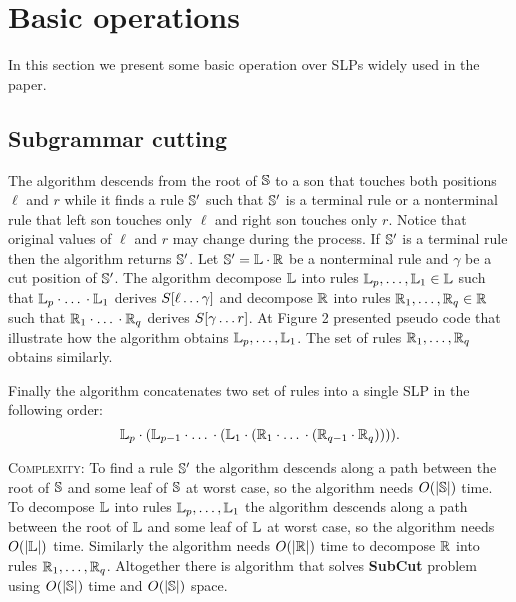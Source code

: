﻿\documentclass[11pt]{article}
\begin{document}
\begin{figure}[t]
	\FibonacciWordSLP
\end{figure}

\section{Basic operations}

In this section we present some basic operation over SLPs widely used in the paper. 

\subsection{Subgrammar cutting}


 The algorithm descends from the root of $\mathbb{S}$ to a son that touches both positions $\ell$
and $r$ while it finds a rule $\mathbb{S}'$ such that $\mathbb{S}'$ is a terminal rule or a nonterminal rule that left son
touches only $\ell$ and right son touches only $r$. Notice that original values of $\ell$ and $r$ may change during the
process. If $\mathbb{S}'$ is a terminal rule then the algorithm returns $\mathbb{S}'$. Let $\mathbb{S}' = \mathbb{L} \cdot \mathbb{R}$
be a nonterminal rule and $\gamma$ be a cut position of $\mathbb{S}'$. The algorithm decompose $\mathbb{L}$ into rules
$\mathbb{L}_p, \dots, \mathbb{L}_1 \in \mathbb{L}$ such that $\mathbb{L}_p \cdot \mbox{\dots} \cdot \mathbb{L}_1$ derives
$S[\ell\dots\gamma]$ and decompose $\mathbb{R}$ into rules $\mathbb{R}_1, \dots, \mathbb{R}_q \in \mathbb{R}$ such that
$\mathbb{R}_1 \cdot \mbox{\dots} \cdot \mathbb{R}_q$ derives $S[\gamma\dots r]$. At Figure 2 presented pseudo code that
illustrate how the algorithm obtains $\mathbb{L}_p, \dots, \mathbb{L}_1$. The set of rules $\mathbb{R}_1, \dots, \mathbb{R}_q$ obtains similarly.

\SubCutPseudoCode

Finally the algorithm concatenates two set of rules into a single SLP in the following order: $$\mathbb{L}_p \cdot
(\mathbb{L}_{p-1} \cdot \mbox{\dots} \cdot (\mathbb{L}_1 \cdot (\mathbb{R}_1 \cdot \mbox{\dots} \cdot (\mathbb{R}_{q-1} \cdot
\mathbb{R}_q) ) ) ).$$

\noindent \textsc{Complexity:} To find a rule $\mathbb{S}'$ the algorithm descends along a path between the root of
$\mathbb{S}$ and some leaf of $\mathbb{S}$ at worst case, so the algorithm needs $O(|\mathbb{S}|)$ time. To decompose $\mathbb{L}$
into rules $\mathbb{L}_p, \dots, \mathbb{L}_1$ the algorithm descends along a path between the root of $\mathbb{L}$ and some leaf
of $\mathbb{L}$ at worst case, so the algorithm needs $O(|\mathbb{L}|)$ time. Similarly the algorithm needs $O(|\mathbb{R}|)$ time
to decompose $\mathbb{R}$ into rules $\mathbb{R}_1, \dots, \mathbb{R}_q$. Altogether there is algorithm that solves
\textbf{SubCut} problem using $O(|\mathbb{S}|)$ time and $O(|\mathbb{S}|)$ space.
\end{document}
